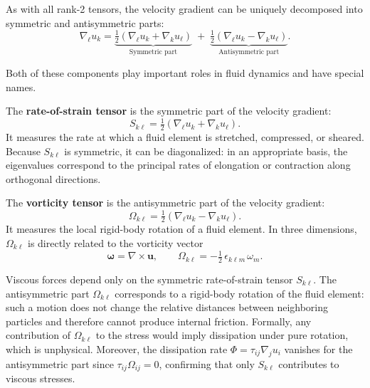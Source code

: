 As with all rank-2 tensors, the velocity gradient can be uniquely decomposed into symmetric and antisymmetric parts:
\[
\nabla_\ell u_k = 
\underbrace{\tfrac{1}{2}\left(\nabla_\ell u_k + \nabla_k u_\ell\right)}_{\text{Symmetric part}} \;+\;
\underbrace{\tfrac{1}{2}\left(\nabla_\ell u_k - \nabla_k u_\ell\right)}_{\text{Antisymmetric part}}.
\]

Both of these components play important roles in fluid dynamics and have special names.

\begin{definition}
The \textbf{rate-of-strain tensor} is the symmetric part of the velocity gradient:
\[
S_{k\ell} = \tfrac{1}{2}\left(\nabla_\ell u_k + \nabla_k u_\ell\right).
\]
It measures the rate at which a fluid element is stretched, compressed, or sheared. Because $S_{k\ell}$ is symmetric, it can be diagonalized: in an appropriate basis, the eigenvalues correspond to the principal rates of elongation or contraction along orthogonal directions.
\end{definition}

\begin{definition}
The \textbf{vorticity tensor} is the antisymmetric part of the velocity gradient:
\[
\Omega_{k\ell} = \tfrac{1}{2}\left(\nabla_\ell u_k - \nabla_k u_\ell\right).
\]
It measures the local rigid-body rotation of a fluid element. In three dimensions, $\Omega_{k\ell}$ is directly related to the vorticity vector
\[
\boldsymbol{\omega} = \nabla \times \mathbf{u}, \qquad
\Omega_{k\ell} = -\tfrac{1}{2}\,\epsilon_{k\ell m}\,\omega_m.
\]
\end{definition}

\noindent
\noindent
Viscous forces depend only on the symmetric rate-of-strain tensor $S_{k\ell}$. 
The antisymmetric part $\Omega_{k\ell}$ corresponds to a rigid-body rotation of the fluid element: such a motion does not change the relative distances between neighboring particles and therefore cannot produce internal friction. 
Formally, any contribution of $\Omega_{k\ell}$ to the stress would imply dissipation under pure rotation, which is unphysical. 
Moreover, the dissipation rate $\Phi = \tau_{ij} \nabla_j u_i$ vanishes for the antisymmetric part since $\tau_{ij}\Omega_{ij}=0$, confirming that only $S_{k\ell}$ contributes to viscous stresses.

\vspace{0.5cm}

